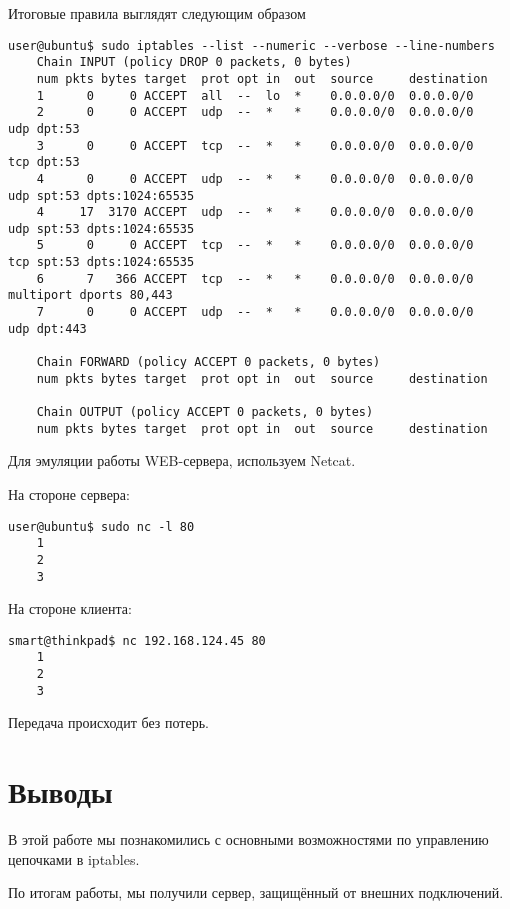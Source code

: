 Итоговые правила выглядят следующим образом
\begin{Verbatim}[frame=single,breaklines=true,breakanywhere=true]
    user@ubuntu$ sudo iptables --list --numeric --verbose --line-numbers
    Chain INPUT (policy DROP 0 packets, 0 bytes)
    num pkts bytes target  prot opt in  out  source     destination
    1      0     0 ACCEPT  all  --  lo  *    0.0.0.0/0  0.0.0.0/0  
    2      0     0 ACCEPT  udp  --  *   *    0.0.0.0/0  0.0.0.0/0   udp dpt:53
    3      0     0 ACCEPT  tcp  --  *   *    0.0.0.0/0  0.0.0.0/0   tcp dpt:53
    4      0     0 ACCEPT  udp  --  *   *    0.0.0.0/0  0.0.0.0/0   udp spt:53 dpts:1024:65535
    4     17  3170 ACCEPT  udp  --  *   *    0.0.0.0/0  0.0.0.0/0   udp spt:53 dpts:1024:65535
    5      0     0 ACCEPT  tcp  --  *   *    0.0.0.0/0  0.0.0.0/0   tcp spt:53 dpts:1024:65535
    6      7   366 ACCEPT  tcp  --  *   *    0.0.0.0/0  0.0.0.0/0   multiport dports 80,443
    7      0     0 ACCEPT  udp  --  *   *    0.0.0.0/0  0.0.0.0/0   udp dpt:443

    Chain FORWARD (policy ACCEPT 0 packets, 0 bytes)
    num pkts bytes target  prot opt in  out  source     destination

    Chain OUTPUT (policy ACCEPT 0 packets, 0 bytes)
    num pkts bytes target  prot opt in  out  source     destination
\end{Verbatim}

Для эмуляции работы WEB-сервера, используем Netcat.

На стороне сервера:
\begin{Verbatim}[frame=single,breaklines=true,breakanywhere=true]
    user@ubuntu$ sudo nc -l 80
    1
    2
    3
\end{Verbatim}

На стороне клиента:
\begin{Verbatim}[frame=single,breaklines=true,breakanywhere=true]
    smart@thinkpad$ nc 192.168.124.45 80
    1
    2
    3
\end{Verbatim}

Передача происходит без потерь.

\section*{Выводы}

В этой работе мы познакомились с основными возможностями по управлению цепочками в iptables.

По итогам работы, мы получили сервер, защищённый от внешних подключений.

